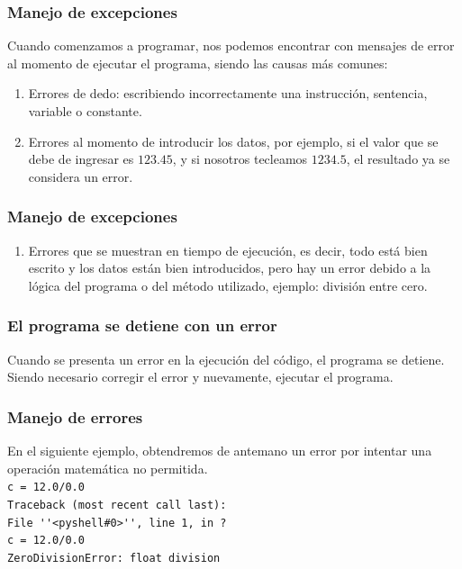 \documentclass[12pt]{beamer}
\begin{document}
\begin{frame}[fragile]
\frametitle{Manejo de excepciones}
Cuando comenzamos a programar, nos podemos encontrar con mensajes de error al momento de ejecutar el programa, siendo las causas más comunes:
\pause
{}
\begin{enumerate}[<+->]
\item Errores de dedo: escribiendo incorrectamente una instrucción, sentencia, variable o constante.
\item Errores al momento de introducir los datos, por ejemplo, si el valor que se debe de ingresar es $123.45$, y si nosotros tecleamos $1234.5$, el resultado ya se considera un error.
\seti
\end{enumerate}
\end{frame}
\begin{frame}[fragile]
\frametitle{Manejo de excepciones}
\begin{enumerate}[<+->]
\conti    
\item Errores que se muestran en tiempo de ejecución, es decir, todo está bien escrito y los datos están bien introducidos, pero hay un error debido a la lógica del programa o del método utilizado, ejemplo: división entre cero.
\end{enumerate}
\end{frame}
\begin{frame}
\frametitle{El programa se detiene con un error}
Cuando se presenta un error en la ejecución del código, el programa se detiene.
\\
\bigskip
\pause
Siendo necesario corregir el error y nuevamente, ejecutar el programa.
\end{frame}
\begin{frame}[fragile]
\frametitle{Manejo de errores}
En el siguiente ejemplo, obtendremos de antemano un error por intentar una operación matemática no permitida.
\\
\bigskip
\verb|c = 12.0/0.0| \\
\pause
\verb|Traceback (most recent call last):| \\
\verb|File ''<pyshell#0>'', line 1, in ?| \\
\verb|c = 12.0/0.0| \\
\verb|ZeroDivisionError: float division|
\end{frame}
\end{document}
